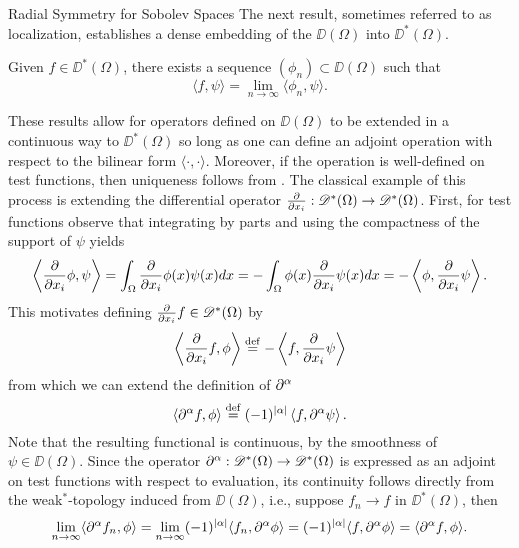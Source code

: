 \begin{chapter}{Radial Symmetry for Sobolev Spaces}
The next result, sometimes referred to as localization, establishes a dense embedding of the $\DD(\Omega)$ into $\DD^*(\Omega)$.
\begin{thm} \label{thm:localization}
  Given $f\in \DD^*(\Omega)$, there exists a sequence $(\phi_n) \subset \DD(\Omega)$ such that 
  \begin{equation}
    \langle f,\psi\rangle = \lim_{n\to\infty}\langle \phi_n,\psi\rangle.
  \end{equation}
\end{thm}

These results allow for operators defined on $\DD(\Omega)$ to be extended in a continuous way to $\DD^*(\Omega)$ so long as one can define an adjoint operation with respect to the bilinear form $\langle \cdot,\cdot \rangle$.
Moreover, if the operation is well-defined on test functions, then uniqueness follows from .
The classical example of this process is extending the differential operator $\frac{\partial}{\partial x_i}:\mathscr D^*(\Omega) \to \mathscr D^*(\Omega)$. 
First, for test functions observe that integrating by parts and using the compactness of the support of $\psi$ yields
\begin{equation}
  \left\langle \frac{\partial}{\partial x_i} \phi,\psi \right\rangle = \int_{\Omega} \frac{\partial}{\partial x_i} \phi(x) \psi(x) dx = - \int_{\Omega}\phi(x) \frac{\partial}{\partial x_i} \psi(x)dx =- \left\langle \phi, \frac{\partial}{\partial x_i} \psi\right\rangle.
\end{equation}
This motivates defining $\frac{\partial}{\partial x_i} f \in \mathscr D^*(\Omega)$ by
\begin{equation}
  \left\langle \frac{\partial}{\partial x_i} f, \phi \right\rangle 
    \stackrel{\rm def}{=}  - \left\langle f, \frac{\partial}{\partial x_i} \psi\right\rangle
\end{equation}
from which we can extend the definition of $\partial^\alpha$
\begin{equation}\label{eq:distributionalDerivative}
  \left\langle \partial^\alpha f, \phi \right\rangle 
    \stackrel{\rm def}{=}  (-1)^{|\alpha|} \left\langle f, \partial^\alpha \psi\right\rangle.
\end{equation}
Note that the resulting functional is continuous, by the smoothness of $\psi \in \DD(\Omega)$.
Since the operator $\partial^\alpha:\mathscr D^*(\Omega)\to\mathscr D^*(\Omega)$ is expressed as an adjoint on test functions with respect to evaluation, its continuity follows directly from the weak$^*$-topology induced from $\DD(\Omega)$, i.e., suppose $f_n \to f$ in $\DD^*(\Omega)$, then
\begin{align}
  \lim_{n\to \infty}\langle \partial^{\alpha}f_n, \phi\rangle 
  = \lim_{n\to\infty}(-1)^{|\alpha|} \langle f_n,\partial^{\alpha}\phi\rangle
  = (-1)^{|\alpha|} \langle f,\partial^{\alpha}\phi\rangle
  = \langle \partial^{\alpha}f, \phi\rangle.
\end{align}


\end{chapter}
